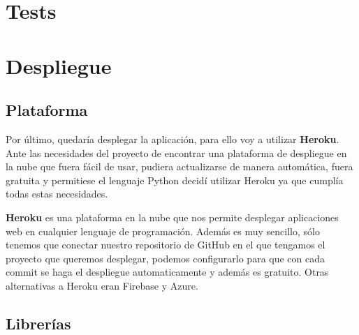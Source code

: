\begin{figure}[H]
  \centering
  \noindent{}
  \caption{}
\end{figure}

\begin{figure}[H]
  \centering
  \noindent{}
  \caption{}
\end{figure}


\section{Tests}


\section{Despliegue}

\subsection{Plataforma}

Por último, quedaría desplegar la aplicación, para ello voy a utilizar \textbf{Heroku}.\\

Ante las necesidades del proyecto de encontrar una plataforma de despliegue en la nube que fuera fácil de usar, pudiera actualizarse de manera automática, fuera gratuita y permitiese el lenguaje Python decidí utilizar Heroku ya que cumplía todas estas necesidades. 

\textbf{Heroku} es una plataforma en la nube que nos permite desplegar aplicaciones web en cualquier lenguaje de programación.
Además es muy sencillo, sólo tenemos que conectar nuestro repositorio de GitHub en el que tengamos el proyecto que queremos desplegar,
podemos configurarlo para que con cada commit se haga el despliegue automaticamente y además es gratuito. Otras alternativas a Heroku 
eran Firebase y Azure.

\subsection{Librerías}

